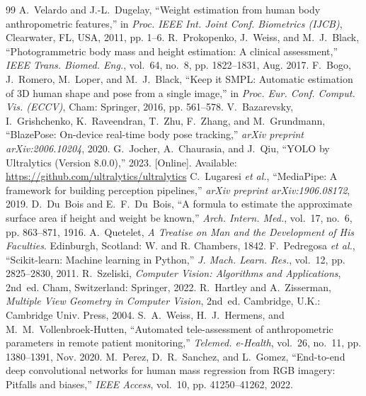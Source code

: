 \documentclass[12pt,a4paper,oneside]{report}
\begin{document}
\clearpage
\begin{thebibliography}{99}
 A.~Velardo and J.-L.~Dugelay, ``Weight estimation from human body anthropometric features,'' in \textit{Proc. IEEE Int. Joint Conf. Biometrics (IJCB)}, Clearwater, FL, USA, 2011, pp. 1--6.
 R.~Prokopenko, J.~Weiss, and M.~J.~Black, ``Photogrammetric body mass and height estimation: A clinical assessment,'' \textit{IEEE Trans. Biomed. Eng.}, vol.~64, no.~8, pp. 1822--1831, Aug. 2017.
 F.~Bogo, J.~Romero, M.~Loper, and M.~J.~Black, ``Keep it SMPL: Automatic estimation of 3D human shape and pose from a single image,'' in \textit{Proc. Eur. Conf. Comput. Vis. (ECCV)}, Cham: Springer, 2016, pp. 561--578.
 V.~Bazarevsky, I.~Grishchenko, K.~Raveendran, T.~Zhu, F.~Zhang, and M.~Grundmann, ``BlazePose: On-device real-time body pose tracking,'' \textit{arXiv preprint arXiv:2006.10204}, 2020.
 G.~Jocher, A.~Chaurasia, and J.~Qiu, ``YOLO by Ultralytics (Version 8.0.0),'' 2023. [Online]. Available: \url{https://github.com/ultralytics/ultralytics}
 C.~Lugaresi \textit{et al.}, ``MediaPipe: A framework for building perception pipelines,'' \textit{arXiv preprint arXiv:1906.08172}, 2019.
 D.~Du~Bois and E.~F.~Du~Bois, ``A formula to estimate the approximate surface area if height and weight be known,'' \textit{Arch. Intern. Med.}, vol.~17, no.~6, pp. 863--871, 1916.
 A.~Quetelet, \textit{A Treatise on Man and the Development of His Faculties}. Edinburgh, Scotland: W. and R. Chambers, 1842.
 F.~Pedregosa \textit{et al.}, ``Scikit-learn: Machine learning in Python,'' \textit{J. Mach. Learn. Res.}, vol.~12, pp. 2825--2830, 2011.
 R.~Szeliski, \textit{Computer Vision: Algorithms and Applications}, 2nd~ed. Cham, Switzerland: Springer, 2022.
 R.~Hartley and A.~Zisserman, \textit{Multiple View Geometry in Computer Vision}, 2nd~ed. Cambridge, U.K.: Cambridge Univ. Press, 2004.
 S.~A.~Weiss, H.~J.~Hermens, and M.~M.~Vollenbroek-Hutten, ``Automated tele-assessment of anthropometric parameters in remote patient monitoring,'' \textit{Telemed. e-Health}, vol.~26, no.~11, pp. 1380--1391, Nov. 2020.
 M.~Perez, D.~R.~Sanchez, and L.~Gomez, ``End-to-end deep convolutional networks for human mass regression from RGB imagery: Pitfalls and biases,'' \textit{IEEE Access}, vol.~10, pp. 41250--41262, 2022.

\end{thebibliography}
\end{document}
